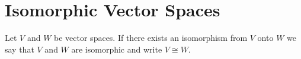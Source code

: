 \documentclass{ximera}
\begin{document}
 
\section{Isomorphic Vector Spaces}
\begin{definition} Let $V$ and $W$ be vector spaces.  If there exists an isomorphism from $V$ onto $W$ we say that $V$ and $W$ are isomorphic and write $V\cong W$.
\end{definition}
\end{document}
